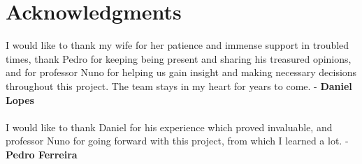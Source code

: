 \chapter*{Acknowledgments}
I would like to thank my wife for her patience and immense support in troubled
times, thank Pedro for keeping being present and sharing his treasured opinions,
and for professor Nuno for helping us gain insight and making necessary
decisions throughout this project. The team stays in my heart for years to
come. - \textbf{Daniel Lopes}
\ \\
\ \\
I would like to thank Daniel for his experience which proved invaluable, and
professor Nuno for going forward with this project, from which I learned a lot. 
- \textbf{Pedro Ferreira}
